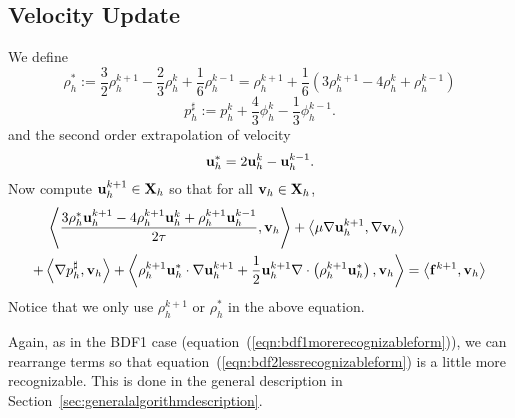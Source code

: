 \documentclass[letterpaper]{erdc}
\begin{document}
\subsection{Velocity Update}
We define
\begin{equation}
  \rho_h^{*} := \frac{3}{2}\rho_h^{k+1} - \frac{2}{3}\rho_h^{k} + \frac{1}{6}\rho_h^{k-1} = \rho_h^{k+1} + \frac{1}{6}\left(3\rho_h^{k+1} -4\rho_h^{k} + \rho_h^{k-1} \right)
\end{equation}
\begin{equation}
  p_h^{\sharp} := p_h^{k} + \frac{4}{3}\phi_h^{k} - \frac{1}{3}\phi_h^{k-1}.
\end{equation}
and the second order extrapolation of velocity
\begin{equation}
  \textbf{u}^{*}_h = 2\textbf{u}_h^{k}  - \textbf{u}_h^{k-1}.
\end{equation}
Now compute $\textbf{u}_h^{k+1}\in\textbf{X}_h$ so that for all $\textbf{v}_h\in\textbf{X}_h$,
\begin{equation}\label{eqn:bdf2lessrecognizableform}
  \begin{split}
    \left\langle \frac{3\rho_h^{*}\textbf{u}_h^{k+1} - 4\rho_h^{k+1}\textbf{u}_h^{k} + \rho_h^{k+1}\textbf{u}_h^{k-1}}{2\tau}, \textbf{v}_h \right\rangle  + \left\langle \mu\nabla\textbf{u}_h^{k+1}, \nabla\textbf{v}_h \right\rangle &\\
   + \left\langle \nabla p_h^{\sharp}, \textbf{v}_h \right\rangle + \left\langle \rho_h^{k+1}\textbf{u}_h^{*}\cdot\nabla\textbf{u}_h^{k+1} + \frac{1}{2}\textbf{u}_h^{k+1}\nabla\cdot\left( \rho_h^{k+1}\textbf{u}_h^{*} \right), \textbf{v}_h \right\rangle &= \left\langle \mathbf{f}^{k+1}, \textbf{v}_h \right\rangle
  \end{split}
\end{equation}
Notice that we only use $\rho_h^{k+1}$ or $\rho_h^{*}$ in the above equation.

\begin{remark}
Again, as in the BDF1 case (equation~(\ref{eqn:bdf1morerecognizableform})), we can rearrange terms so that equation~(\ref{eqn:bdf2lessrecognizableform}) is a little more recognizable.  This is done in the general description in Section~\ref{sec:generalalgorithmdescription}.
\end{remark}
\end{document}
